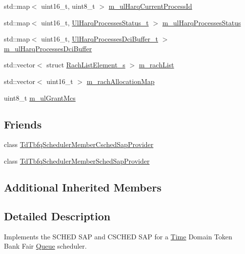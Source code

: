 \begin{DoxyCompactItemize}
\item 
std\+::map$<$ uint16\+\_\+t, uint8\+\_\+t $>$ \hyperlink{classns3_1_1TdTbfqFfMacScheduler_a418d37c6f77b19886fe25e71c103e8b1}{m\+\_\+ul\+Harq\+Current\+Process\+Id}
\item 
std\+::map$<$ uint16\+\_\+t, \hyperlink{namespacens3_af765c4daaafe4ea4809c1041fc196629}{Ul\+Harq\+Processes\+Status\+\_\+t} $>$ \hyperlink{classns3_1_1TdTbfqFfMacScheduler_a845d3e79ce5c38b47c8ac8a7e4cc5b37}{m\+\_\+ul\+Harq\+Processes\+Status}
\item 
std\+::map$<$ uint16\+\_\+t, \hyperlink{namespacens3_a042cbd6bf67e73911cba35b8c070223d}{Ul\+Harq\+Processes\+Dci\+Buffer\+\_\+t} $>$ \hyperlink{classns3_1_1TdTbfqFfMacScheduler_aa7b74d7f5898ae380db92cdd1205efae}{m\+\_\+ul\+Harq\+Processes\+Dci\+Buffer}
\item 
std\+::vector$<$ struct \hyperlink{structns3_1_1RachListElement__s}{Rach\+List\+Element\+\_\+s} $>$ \hyperlink{classns3_1_1TdTbfqFfMacScheduler_a103dfe516b13e9ca8e0d1247c11b3679}{m\+\_\+rach\+List}
\item 
std\+::vector$<$ uint16\+\_\+t $>$ \hyperlink{classns3_1_1TdTbfqFfMacScheduler_a09760afce6c2b248fbc5cbcffb9dede5}{m\+\_\+rach\+Allocation\+Map}
\item 
uint8\+\_\+t \hyperlink{classns3_1_1TdTbfqFfMacScheduler_a7382f05e10e61de33d6559202a1252bd}{m\+\_\+ul\+Grant\+Mcs}
\end{DoxyCompactItemize}
\subsection*{Friends}
\begin{DoxyCompactItemize}
\item 
class \hyperlink{classns3_1_1TdTbfqFfMacScheduler_ad2f079679137356c7b49387428bb961e}{Td\+Tbfq\+Scheduler\+Member\+Csched\+Sap\+Provider}
\item 
class \hyperlink{classns3_1_1TdTbfqFfMacScheduler_a68369554f57aba1ab95ff0287e757a78}{Td\+Tbfq\+Scheduler\+Member\+Sched\+Sap\+Provider}
\end{DoxyCompactItemize}
\subsection*{Additional Inherited Members}


\subsection{Detailed Description}
Implements the S\+C\+H\+ED S\+AP and C\+S\+C\+H\+ED S\+AP for a \hyperlink{classns3_1_1Time}{Time} Domain Token Bank Fair \hyperlink{classns3_1_1Queue}{Queue} scheduler. 


